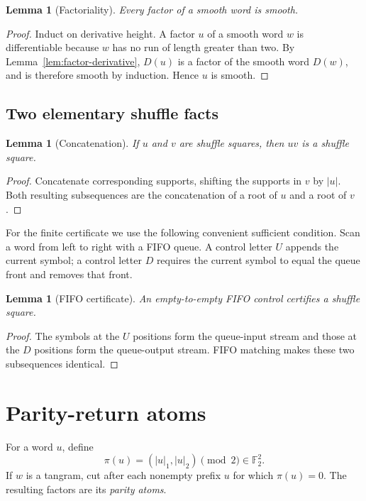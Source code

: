 \documentclass[11pt]{article}
\newtheorem{lemma}[theorem]{Lemma}
\theoremstyle{definition}
\theoremstyle{remark}
\begin{document}
\begin{lemma}[Factoriality]\label{lem:factorial}
Every factor of a smooth word is smooth.
\end{lemma}

\begin{proof}
Induct on derivative height.  A factor $u$ of a smooth word $w$ is
differentiable because $w$ has no run of length greater than two.  By
Lemma~\ref{lem:factor-derivative}, $D(u)$ is a factor of the smooth word
$D(w)$, and is therefore smooth by induction.  Hence $u$ is smooth.
\end{proof}

\subsection{Two elementary shuffle facts}

\begin{lemma}[Concatenation]\label{lem:concat}
If $u$ and $v$ are shuffle squares, then $uv$ is a shuffle square.
\end{lemma}

\begin{proof}
Concatenate corresponding supports, shifting the supports in $v$ by
$|u|$.  Both resulting subsequences are the concatenation of a root of
$u$ and a root of $v$.
\end{proof}

For the finite certificate we use the following convenient sufficient
condition.  Scan a word from left to right with a FIFO queue.  A control
letter $U$ appends the current symbol; a control letter $D$ requires the
current symbol to equal the queue front and removes that front.

\begin{lemma}[FIFO certificate]\label{lem:fifo}
An empty-to-empty FIFO control certifies a shuffle square.
\end{lemma}

\begin{proof}
The symbols at the $U$ positions form the queue-input stream and those
at the $D$ positions form the queue-output stream.  FIFO matching makes
these two subsequences identical.
\end{proof}

\section{Parity-return atoms}

For a word $u$, define
\[
 \pi(u)=(|u|_1,|u|_2)\pmod 2\in\mathbb F_2^2.
\]
If $w$ is a tangram, cut after each nonempty prefix $u$ for which
$\pi(u)=0$.  The resulting factors are its \emph{parity atoms}.
\end{document}

